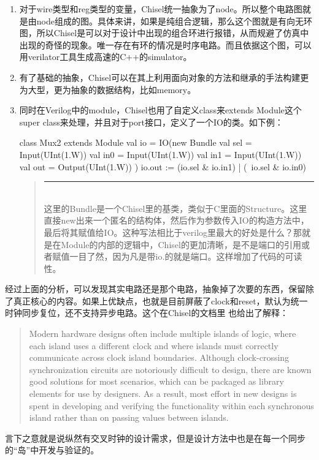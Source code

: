 \documentclass[twocolumn,10pt]{article}
\newenvironment{commentary}
{ \vspace{-0.1in}
  \begin{quotation}
  \noindent
  \small \em
  \rule{\linewidth}{1pt}\\
}
{
  \end{quotation}
}
\begin{document}
\begin{enumerate}
	\item 对于wire类型和reg类型的变量，Chisel统一抽象为了node。所以整个电路图就是由node组成的图。具体来讲，如果是纯组合逻辑，那么这个图就是有向无环图，所以Chisel是可以对于设计中出现的组合环进行报错，从而规避了仿真中出现的奇怪的现象。唯一存在有环的情况是时序电路。而且依据这个图，可以用verilator工具生成高速的C++的simulator。
	\item 有了基础的抽象，Chisel可以在其上利用面向对象的方法和继承的手法构建更为大型，更为抽象的数据结构，比如memory。
	\item 同时在Verilog中的module，Chisel也用了自定义class来extends Module这个super class来处理，并且对于port接口，定义了一个IO的类。如下例：
	\begin{scala}
	class Mux2 extends Module {
		val io = IO(new Bundle{
			val sel = Input(UInt(1.W))
			val in0 = Input(UInt(1.W))
			val in1 = Input(UInt(1.W))
			val out = Output(UInt(1.W))
		})
		io.out := (io.sel & io.in1) | (~io.sel & io.in0)
	}
	\end{scala}
	\begin{commentary}
		这里的Bundle是一个Chisel里的基类，类似于C里面的Structure。这里直接new出来一个匿名的结构体，然后作为参数传入IO的构造方法中，最后将其赋值给IO。这种写法相比于verilog里最大的好处是什么？那就是在Module的内部的逻辑中，Chisel的更加清晰，是不是端口的引用或者赋值一目了然，因为凡是带io.的就是端口。这样增加了代码的可读性。
	\end{commentary}
\end{enumerate}
	经过上面的分析，可以发现其实电路还是那个电路，抽象掉了次要的东西，保留除了真正核心的内容。如果上优缺点，也就是目前屏蔽了clock和reset，默认为统一时钟同步复位，还不支持异步电路。这个在Chisel的文档里%
	也给出了解释：
	\begin{quote}
		Modern hardware designs often include multiple islands of logic, where each island uses a different clock and where islands must correctly communicate across clock island boundaries. Although clock-crossing synchronization circuits are notoriously difficult to design, there are known good solutions for most scenarios, which can be packaged as library elements for use by designers. As a result, most effort in new designs is spent in developing and verifying the functionality within each synchronous island rather than on passing values between islands.
	\end{quote}
	言下之意就是说纵然有交叉时钟的设计需求，但是设计方法中也是在每一个同步的``岛''中开发与验证的。
	
\end{document}
